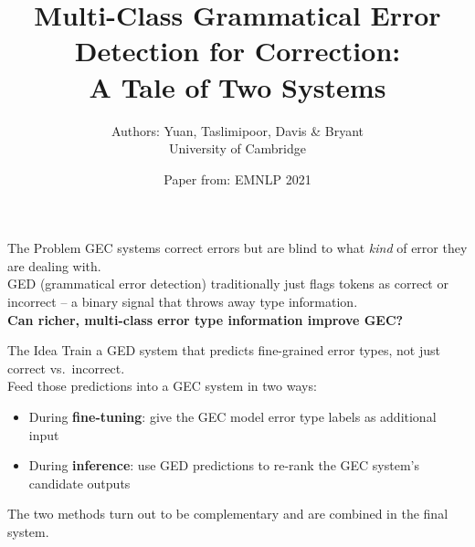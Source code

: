 \documentclass[aspectratio=169]{beamer}
\title{Multi-Class Grammatical Error Detection for Correction:\\
A Tale of Two Systems}
\author{Authors: Yuan, Taslimipoor, Davis \& Bryant \\ \small University of Cambridge}
\date{Paper from: EMNLP 2021}
\begin{document}

\begin{frame}
  \titlepage
\end{frame}


\begin{frame}{The Problem}
  GEC systems correct errors but are blind to what \textit{kind} of error
  they are dealing with.\\[1em]

  GED (grammatical error detection) traditionally just flags tokens as
  correct or incorrect -- a binary signal that throws away type information.\\[1em]

  \textbf{Can richer, multi-class error type information improve GEC?}
\end{frame}

\begin{frame}{The Idea}
  Train a GED system that predicts fine-grained error types,
  not just correct vs.\ incorrect.\\[1.5em]

  Feed those predictions into a GEC system in two ways:

  \begin{itemize}
    \item During \textbf{fine-tuning}: give the GEC model error type labels
      as additional input
    \item During \textbf{inference}: use GED predictions to re-rank
      the GEC system's candidate outputs
  \end{itemize}

  \vspace{1em}
  The two methods turn out to be complementary and are combined
  in the final system.
\end{frame}

\end{document}

